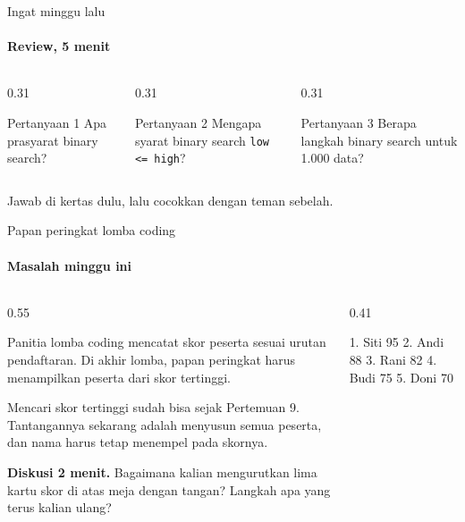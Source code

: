\documentclass[t]{beamer}
\begin{document}
\begin{frame}{Ingat minggu lalu}
\framesubtitle{Review, 5 menit}
\begin{columns}[T]
\begin{column}{0.31\textwidth}
\begin{BlokGelap}{Pertanyaan 1}
Apa prasyarat binary search?
\end{BlokGelap}
\end{column}
\begin{column}{0.31\textwidth}
\begin{BlokGelap}{Pertanyaan 2}
Mengapa syarat binary search \texttt{low <= high}?
\end{BlokGelap}
\end{column}
\begin{column}{0.31\textwidth}
\begin{BlokGelap}{Pertanyaan 3}
Berapa langkah binary search untuk 1.000 data?
\end{BlokGelap}
\end{column}
\end{columns}
\vspace{8pt}
Jawab di kertas dulu, lalu cocokkan dengan teman sebelah.
\end{frame}


\begin{frame}[fragile]{Papan peringkat lomba coding}
\framesubtitle{Masalah minggu ini}
\begin{columns}[T]
\begin{column}{0.55\textwidth}
{\small Panitia lomba coding mencatat skor peserta sesuai urutan pendaftaran. Di akhir lomba, papan peringkat harus menampilkan peserta dari skor tertinggi.

\vspace{6pt}
Mencari skor tertinggi sudah bisa sejak Pertemuan 9. Tantangannya sekarang adalah menyusun semua peserta, dan nama harus tetap menempel pada skornya.\par}
\vspace{6pt}
\begin{Catatan}
\textbf{Diskusi 2 menit.} Bagaimana kalian mengurutkan lima kartu skor di atas meja dengan tangan? Langkah apa yang terus kalian ulang?
\end{Catatan}
\end{column}
\begin{column}{0.41\textwidth}
\begin{Keluaran}[]
1. Siti 95
2. Andi 88
3. Rani 82
4. Budi 75
5. Doni 70
\end{Keluaran}
\end{column}
\end{columns}
\end{frame}
\end{document}
